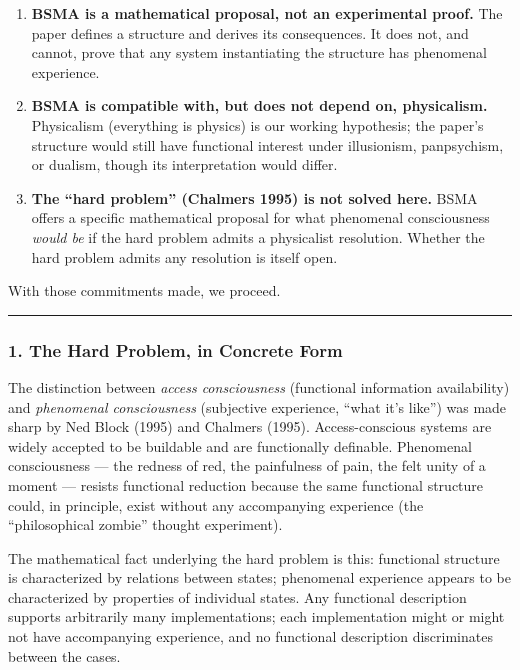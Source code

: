 \documentclass[
  11pt,
  a4paper,
]{article}
\providecommand{\tightlist}{%
  \setlength{\itemsep}{0pt}\setlength{\parskip}{0pt}}
\begin{document}
\begin{enumerate}
\def\labelenumi{\arabic{enumi}.}
\tightlist
\item
  \textbf{BSMA is a mathematical proposal, not an experimental proof.}
  The paper defines a structure and derives its consequences. It does
  not, and cannot, prove that any system instantiating the structure has
  phenomenal experience.
\item
  \textbf{BSMA is compatible with, but does not depend on, physicalism.}
  Physicalism (everything is physics) is our working hypothesis; the
  paper's structure would still have functional interest under
  illusionism, panpsychism, or dualism, though its interpretation would
  differ.
\item
  \textbf{The ``hard problem'' (Chalmers 1995) is not solved here.} BSMA
  offers a specific mathematical proposal for what phenomenal
  consciousness \emph{would be} if the hard problem admits a physicalist
  resolution. Whether the hard problem admits any resolution is itself
  open.
\end{enumerate}

With those commitments made, we proceed.

\begin{center}\rule{0.5\linewidth}{0.5pt}\end{center}

\subsubsection{1. The Hard Problem, in Concrete
Form}\label{the-hard-problem-in-concrete-form}

The distinction between \emph{access consciousness} (functional
information availability) and \emph{phenomenal consciousness}
(subjective experience, ``what it's like'') was made sharp by Ned Block
(1995) and Chalmers (1995). Access-conscious systems are widely accepted
to be buildable and are functionally definable. Phenomenal consciousness
--- the redness of red, the painfulness of pain, the felt unity of a
moment --- resists functional reduction because the same functional
structure could, in principle, exist without any accompanying experience
(the ``philosophical zombie'' thought experiment).

The mathematical fact underlying the hard problem is this: functional
structure is characterized by relations between states; phenomenal
experience appears to be characterized by properties of individual
states. Any functional description supports arbitrarily many
implementations; each implementation might or might not have
accompanying experience, and no functional description discriminates
between the cases.
\end{document}
